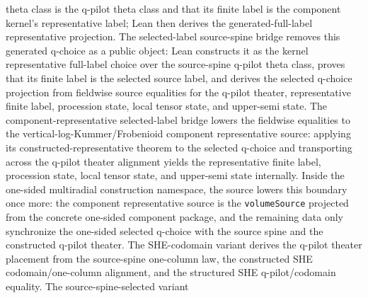 \begin{definition}
  theta class is the q-pilot theta class and that its finite label is the
  component kernel's representative label; Lean then derives the
  generated-full-label representative projection.  The selected-label
  source-spine bridge
  removes this generated q-choice as a public object: Lean constructs it as the
  kernel representative full-label choice over the source-spine q-pilot theta
  class, proves that its finite label is the selected source label, and derives
  the selected q-choice projection from fieldwise source equalities for the
  q-pilot theater, representative finite label, procession state, local tensor
  state, and upper-semi state.  The component-representative selected-label
  bridge
  lowers the fieldwise equalities to the vertical-log-Kummer/Frobenioid
  component representative source: applying its constructed-representative
  theorem to the selected q-choice and transporting across the q-pilot theater
  alignment yields the representative finite label, procession state, local
  tensor state, and upper-semi state internally.  Inside the one-sided
  multiradial construction namespace, the source
  lowers this boundary once more: the component representative source is the
  \texttt{volumeSource} projected from the concrete one-sided component package,
  and the remaining data only synchronize the one-sided selected q-choice with
  the source spine and the constructed q-pilot theater.  The SHE-codomain
  variant
  derives the q-pilot theater placement from the source-spine one-column law,
  the constructed SHE codomain/one-column alignment, and the structured SHE
  q-pilot/codomain equality.  The source-spine-selected variant

\end{definition}
